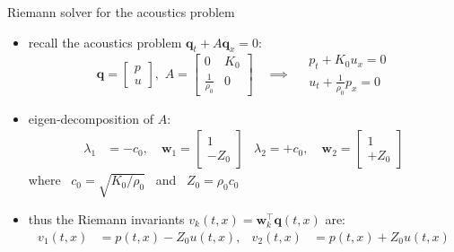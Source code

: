 \documentclass[10pt,hyperref,dvipsnames]{beamer}
\newcommand{\bq}{\mathbf{q}}
\newcommand{\bw}{\mathbf{w}}
\begin{document}
\begin{frame}{Riemann solver for the acoustics problem}

\begin{itemize}
\item recall the acoustics problem $\bq_t + A \bq_x = 0$:
        $$\bq = \begin{bmatrix} p \\ u \end{bmatrix}, \,\, A = \begin{bmatrix} 0 & K_0 \\ \frac{1}{\rho_0} & 0 \end{bmatrix} \quad \implies \quad \begin{matrix} p_t + K_0 u_x = 0 \\ u_t + \frac{1}{\rho_0} p_x = 0 \end{matrix}$$
\item eigen-decomposition of $A$:
\begin{align*}
\lambda_1 &= -c_0, \quad \bw_1 = \begin{bmatrix} 1 \\ -Z_0 \end{bmatrix} & \lambda_2 = +c_0, \quad \bw_2 = \begin{bmatrix} 1 \\ +Z_0 \end{bmatrix}
\end{align*}
where \, $c_0 = \sqrt{K_0/\rho_0}$ \, and \, $Z_0=\rho_0 c_0$
\item thus the Riemann invariants $v_k(t,x) = \bw_k^\top \bq(t,x)$ are:
\begin{align*}
v_1(t,x) &= p(t,x) - Z_0 u(t,x), & v_2(t,x) &= p(t,x) + Z_0 u(t,x)
\end{align*}
\end{itemize}
\end{frame}
\end{document}
